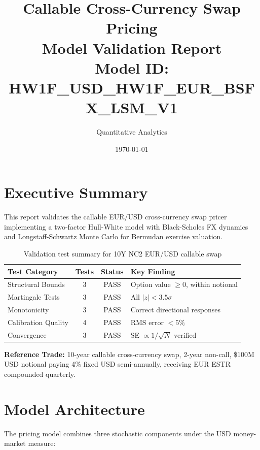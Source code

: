 \documentclass[11pt,a4paper]{article}
\title{\vspace{-1.5cm}\textbf{Callable Cross-Currency Swap Pricing}\\\Large Model Validation Report\\[0.5em]\normalsize Model ID: HW1F\_USD\_HW1F\_EUR\_BSFX\_LSM\_V1}
\author{Quantitative Analytics}
\date{\today}
\begin{document}
\maketitle
\thispagestyle{fancy}

\section{Executive Summary}

This report validates the callable EUR/USD cross-currency swap pricer implementing a two-factor Hull-White model with Black-Scholes FX dynamics and Longstaff-Schwartz Monte Carlo for Bermudan exercise valuation.

\begin{table}[H]
\centering
\begin{tabular}{lccl}
\toprule
\textbf{Test Category} & \textbf{Tests} & \textbf{Status} & \textbf{Key Finding} \\
\midrule
Structural Bounds & 3 & \textcolor{pass}{PASS} & Option value $\geq 0$, within notional \\
Martingale Tests & 3 & \textcolor{pass}{PASS} & All $|z| < 3.5\sigma$ \\
Monotonicity & 3 & \textcolor{pass}{PASS} & Correct directional responses \\
Calibration Quality & 4 & \textcolor{pass}{PASS} & RMS error $< 5\%$ \\
Convergence & 3 & \textcolor{pass}{PASS} & SE $\propto 1/\sqrt{N}$ verified \\
\bottomrule
\end{tabular}
\caption{Validation test summary for 10Y NC2 EUR/USD callable swap}
\end{table}

\textbf{Reference Trade:} 10-year callable cross-currency swap, 2-year non-call, \$100M USD notional paying 4\% fixed USD semi-annually, receiving EUR ESTR compounded quarterly.

\section{Model Architecture}

The pricing model combines three stochastic components under the USD money-market measure:
\end{document}
